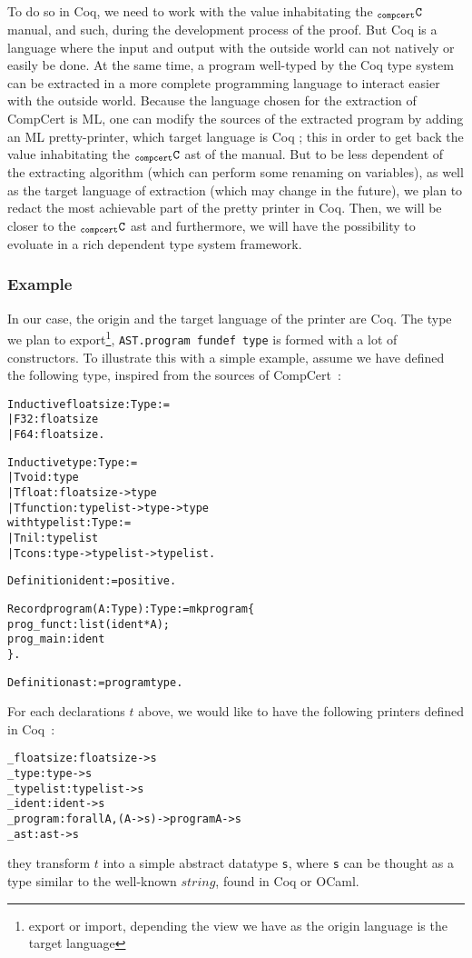 \documentclass[a4paper, 11pt]{article}
\newenvironment{coq}
  {\selectlanguage{english} \begin{alltt}} %% 8.3pl1 (January 2011)
  {\end{alltt} \selectlanguage{francais}}
\newcommand{\C}{$_{\tt compcert}{\tt C}$\xspace}
\begin{document}
To do so in Coq, we need to work with the value inhabitating the \C manual, and such, during the development process of the proof. But Coq is a language where the input and output with the outside world can not natively or easily be done. At the same time, a program well-typed by the Coq type system can be extracted in a more complete programming language to interact easier with the outside world. Because the language chosen for the extraction of CompCert is ML, one can modify the sources of the extracted program by adding an ML pretty-printer, which target language is Coq ; this in order to get back the value inhabitating the \C ast of the manual. But to be less dependent of the extracting algorithm (which can perform some renaming on variables), as well as the target language of extraction (which may change in the future), we plan to redact the most achievable part of the pretty printer in Coq. Then, we will be closer to the \C ast and furthermore, we will have the possibility to evoluate in a rich dependent type system framework. 
\subsubsection{Example}
In our case, the origin and the target language of the printer are Coq. The type we plan to export\footnote{export or import, depending the view we have as the origin language is the target language}, \verb|AST.program fundef type| is formed with a lot of constructors. To illustrate this with a simple example, assume we have defined the following type, inspired from the sources of CompCert~:
\begin{coq}
Inductive floatsize : Type :=
  | F32: floatsize
  | F64: floatsize.

Inductive type : Type :=
  | Tvoid : type
  | Tfloat: floatsize -> type
  | Tfunction: typelist -> type -> type
with typelist : Type :=
  | Tnil : typelist
  | Tcons : type -> typelist -> typelist.

Definition ident := positive.

Record program (A : Type) : Type := mkprogram \{
  prog_funct : list (ident * A);
  prog_main : ident
\}.

Definition ast := program type.
\end{coq}
For each declarations $t$ above, we would like to have the following printers defined in Coq~:
\begin{coq}
_floatsize : floatsize -> s
_type : type -> s
_typelist : typelist -> s
_ident : ident -> s
_program : forall A, (A -> s) -> program A -> s
_ast : ast -> s
\end{coq}
they transform $t$ into a simple abstract datatype \verb|s|, where \verb|s| can be thought as a type similar to the well-known $string$, found in Coq or OCaml.
\end{document}
